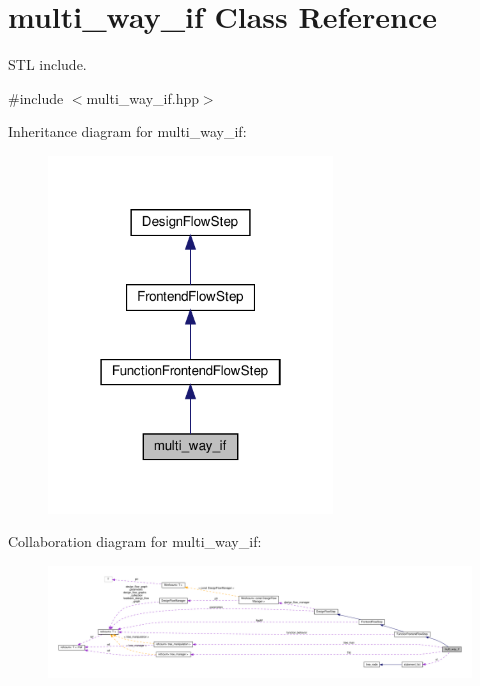 \hypertarget{classmulti__way__if}{}\section{multi\+\_\+way\+\_\+if Class Reference}
\label{classmulti__way__if}


S\+TL include.  




{\ttfamily \#include $<$multi\+\_\+way\+\_\+if.\+hpp$>$}



Inheritance diagram for multi\+\_\+way\+\_\+if\+:
\nopagebreak
\begin{figure}[H]
\begin{center}
\leavevmode
\includegraphics[width=214pt]{db/d2c/classmulti__way__if__inherit__graph}
\end{center}
\end{figure}


Collaboration diagram for multi\+\_\+way\+\_\+if\+:
\nopagebreak
\begin{figure}[H]
\begin{center}
\leavevmode
\includegraphics[width=350pt]{d5/d6e/classmulti__way__if__coll__graph}
\end{center}
\end{figure}
